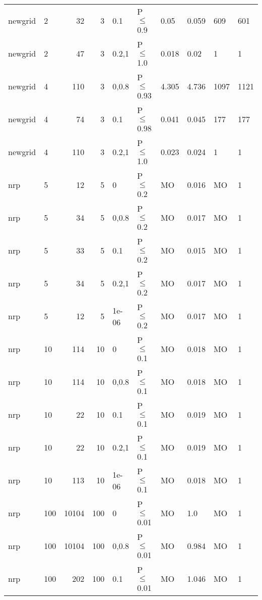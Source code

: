 \begin{longtable}{llrrllllll}
 newgrid       & 2        &     	32 &   3 & 0.1   & P$\leq$0.9   & 0.05    & 0.059    & 609    & 601    \\
 newgrid       & 2        &     	47 &   3 & 0.2,1 & P$\leq$1.0   & 0.018   & 0.02     & 1      & 1      \\
 newgrid       & 4        &    	110 &   3 & 0,0.8 & P$\leq$0.93  & 4.305   & 4.736    & 1097   & 1121   \\
 newgrid       & 4        &     	74 &   3 & 0.1   & P$\leq$0.98  & 0.041   & 0.045    & 177    & 177    \\
 newgrid       & 4        &    	110 &   3 & 0.2,1 & P$\leq$1.0   & 0.023   & 0.024    & 1      & 1      \\
 nrp           & 5        &     	12 &   5 & 0     & P$\leq$0.2   & MO      & 0.016    & MO     & 1      \\
 nrp           & 5        &     	34 &   5 & 0,0.8 & P$\leq$0.2   & MO      & 0.017    & MO     & 1      \\
 nrp           & 5        &     	33 &   5 & 0.1   & P$\leq$0.2   & MO      & 0.015    & MO     & 1      \\
 nrp           & 5        &     	34 &   5 & 0.2,1 & P$\leq$0.2   & MO      & 0.017    & MO     & 1      \\
 nrp           & 5        &     	12 &   5 & 1e-06 & P$\leq$0.2   & MO      & 0.017    & MO     & 1      \\
 nrp           & 10       &    	114 &  10 & 0     & P$\leq$0.1   & MO      & 0.018    & MO     & 1      \\
 nrp           & 10       &    	114 &  10 & 0,0.8 & P$\leq$0.1   & MO      & 0.018    & MO     & 1      \\
 nrp           & 10       &     	22 &  10 & 0.1   & P$\leq$0.1   & MO      & 0.019    & MO     & 1      \\
 nrp           & 10       &     	22 &  10 & 0.2,1 & P$\leq$0.1   & MO      & 0.019    & MO     & 1      \\
 nrp           & 10       &    	113 &  10 & 1e-06 & P$\leq$0.1   & MO      & 0.018    & MO     & 1      \\
 nrp           & 100      &  	10104 & 100 & 0     & P$\leq$0.01  & MO      & 1.0      & MO     & 1      \\
 nrp           & 100      &  	10104 & 100 & 0,0.8 & P$\leq$0.01  & MO      & 0.984    & MO     & 1      \\
 nrp           & 100      &    	202 & 100 & 0.1   & P$\leq$0.01  & MO      & 1.046    & MO     & 1      \\

\end{longtable}
